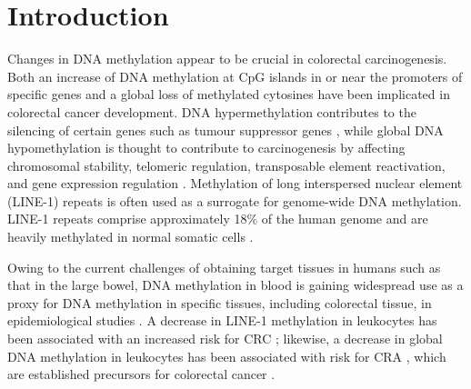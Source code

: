 \newpage 
 
\section[]{Introduction} %
\noindent Changes in DNA methylation appear to be crucial in colorectal carcinogenesis. Both an increase of DNA methylation at CpG islands in or near the promoters of specific genes \cite{c51,c52} and a global loss of methylated cytosines \cite{c53} have been implicated in colorectal cancer development. DNA hypermethylation contributes to the silencing of certain genes such as tumour suppressor genes \cite{c54}, while global DNA hypomethylation is thought to contribute to carcinogenesis by affecting chromosomal stability, telomeric regulation, transposable element reactivation, and gene expression regulation \cite{c55}. Methylation of long interspersed nuclear element (LINE-1) repeats is often used as a surrogate for genome-wide DNA methylation. LINE-1 repeats comprise approximately 18\% of the human genome and are heavily methylated in normal somatic cells \cite{c56}.

\noindent Owing to the current challenges of obtaining target tissues in humans such as that in the large bowel, DNA methylation in blood is gaining widespread use as a proxy for DNA methylation in specific tissues, including colorectal tissue, in epidemiological studies \cite{c57,c58,c59,c510}. A decrease in LINE-1 methylation in leukocytes has been associated with an increased risk for CRC \cite{c511}; likewise, a decrease in global DNA methylation in leukocytes has been associated with risk for CRA \cite{c57,c58}, which are established precursors for colorectal cancer \cite{c512,c513,c514}.

